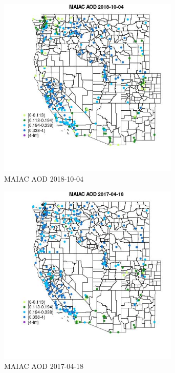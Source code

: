 \begin{figure} 
\centering  
\includegraphics[width=0.77\textwidth]{Code_Outputs/Report_ML_input_PM25_Step4_part_f_de_duplicated_aves_prioritize_24hr_obswNAs_MapObsMAIAC_AOD2018-10-04.jpg} 
\caption{\label{fig:Report_ML_input_PM25_Step4_part_f_de_duplicated_aves_prioritize_24hr_obswNAsMapObsMAIAC_AOD2018-10-04}MAIAC AOD 2018-10-04} 
\end{figure} 
 

\clearpage 

\begin{figure} 
\centering  
\includegraphics[width=0.77\textwidth]{Code_Outputs/Report_ML_input_PM25_Step4_part_f_de_duplicated_aves_prioritize_24hr_obswNAs_MapObsMAIAC_AOD2017-04-18.jpg} 
\caption{\label{fig:Report_ML_input_PM25_Step4_part_f_de_duplicated_aves_prioritize_24hr_obswNAsMapObsMAIAC_AOD2017-04-18}MAIAC AOD 2017-04-18} 
\end{figure} 
 

